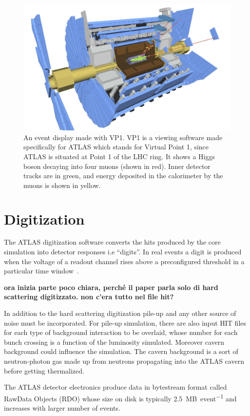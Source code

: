\begin{figure}[tp]
\centering
\includegraphics[width=.75\textwidth]{MCSample/simulation}
\caption{An event display made with VP1. VP1 is a viewing software made specifically for ATLAS which stands for Virtual Point 1, since ATLAS is situated at Point 1 of the LHC ring. It shows a Higgs boson decaying into four muons (shown in red). Inner detector tracks are in green, and energy deposited in the calorimeter by the muons is shown in yellow.}
\label{fig:simulation}
\end{figure}

\section{Digitization}
The ATLAS digitization software converts the hits produced by the core simulation into detector responses i.e ``digits''. In real events a digit is produced when the voltage of a readout channel rises above a preconfigured threshold in a particular time window~\cite{simulation}.

{\bfseries ora inizia parte poco chiara, perch\'e il paper parla solo di hard scattering digitizzato. non c'era tutto nel file hit?}

In addition to the hard scattering digitization pile-up and any other source of noise must be incorporated. For pile-up simulation, there are also input HIT files for each type of background interaction to be overlaid, whose number for each bunch crossing is a function of the luminosity simulated. Moreover cavern background could influence the simulation. The cavern background is a sort of neutron-photon gas made up from neutrons propagating into the ATLAS cavern before getting thermalized. 

The ATLAS detector electronics produce data in bytestream format called RawData Objects (RDO) whose size on disk is typically \SI{2.5}{MB\per event} and increases with larger number of \pileup events.

